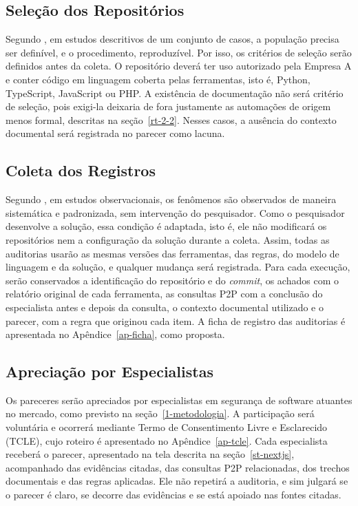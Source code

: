 \subsection{Seleção dos Repositórios}
\label{met-selecao}

Segundo , em estudos descritivos de um conjunto de casos, a população precisa ser definível, e o procedimento, reproduzível. Por isso, os critérios de seleção serão definidos antes da coleta. O repositório deverá ter uso autorizado pela Empresa A e conter código em linguagem coberta pelas ferramentas, isto é, Python, TypeScript, JavaScript ou PHP. A existência de documentação não será critério de seleção, pois exigi-la deixaria de fora justamente as automações de origem menos formal, descritas na seção~\ref{rt-2-2}. Nesses casos, a ausência do contexto documental será registrada no parecer como lacuna.

\subsection{Coleta dos Registros}
\label{met-coleta}

Segundo , em estudos observacionais, os fenômenos são observados de maneira sistemática e padronizada, sem intervenção do pesquisador. Como o pesquisador desenvolve a solução, essa condição é adaptada, isto é, ele não modificará os repositórios nem a configuração da solução durante a coleta. Assim, todas as auditorias usarão as mesmas versões das ferramentas, das regras, do modelo de linguagem e da solução, e qualquer mudança será registrada. Para cada execução, serão conservados a identificação do repositório e do \textit{commit}, os achados com o relatório original de cada ferramenta, as consultas P2P com a conclusão do especialista antes e depois da consulta, o contexto documental utilizado e o parecer, com a regra que originou cada item. A ficha de registro das auditorias é apresentada no Apêndice~\ref{ap-ficha}, como proposta.

\subsection{Apreciação por Especialistas}
\label{met-apreciacao}

Os pareceres serão apreciados por especialistas em segurança de software atuantes no mercado, como previsto na seção~\ref{1-metodologia}. A participação será voluntária e ocorrerá mediante Termo de Consentimento Livre e Esclarecido (TCLE), cujo roteiro é apresentado no Apêndice~\ref{ap-tcle}. Cada especialista receberá o parecer, apresentado na tela descrita na seção~\ref{st-nextjs}, acompanhado das evidências citadas, das consultas P2P relacionadas, dos trechos documentais e das regras aplicadas. Ele não repetirá a auditoria, e sim julgará se o parecer é claro, se decorre das evidências e se está apoiado nas fontes citadas.

